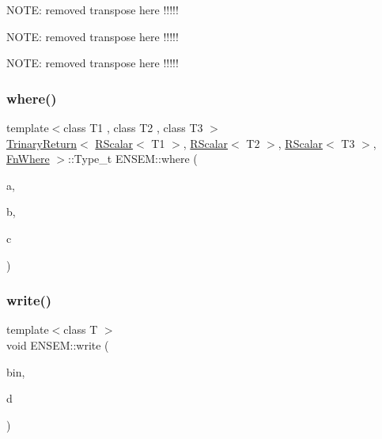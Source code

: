 N\+O\+TE\+: removed transpose here !!!!!

N\+O\+TE\+: removed transpose here !!!!!

N\+O\+TE\+: removed transpose here !!!!! \mbox{\label{group__rscalar_gab32228a08de8d1e17ba1f7829c1aff56}} 
\subsubsection{\texorpdfstring{where()}{where()}}
{\footnotesize\ttfamily template$<$class T1 , class T2 , class T3 $>$ \\
\mbox{\hyperlink{structENSEM_1_1TrinaryReturn}{Trinary\+Return}}$<$ \mbox{\hyperlink{classENSEM_1_1RScalar}{R\+Scalar}}$<$ T1 $>$, \mbox{\hyperlink{classENSEM_1_1RScalar}{R\+Scalar}}$<$ T2 $>$, \mbox{\hyperlink{classENSEM_1_1RScalar}{R\+Scalar}}$<$ T3 $>$, \mbox{\hyperlink{structENSEM_1_1FnWhere}{Fn\+Where}} $>$\+::Type\+\_\+t E\+N\+S\+E\+M\+::where (\begin{DoxyParamCaption}\item[{const \mbox{\hyperlink{classENSEM_1_1RScalar}{R\+Scalar}}$<$ T1 $>$ \&}]{a,  }\item[{const \mbox{\hyperlink{classENSEM_1_1RScalar}{R\+Scalar}}$<$ T2 $>$ \&}]{b,  }\item[{const \mbox{\hyperlink{classENSEM_1_1RScalar}{R\+Scalar}}$<$ T3 $>$ \&}]{c }\end{DoxyParamCaption})\hspace{0.3cm}{\ttfamily [inline]}}

\mbox{\label{group__rscalar_ga22fa002fd1c18dfe5d521aef45102477}} 
\subsubsection{\texorpdfstring{write()}{write()}}
{\footnotesize\ttfamily template$<$class T $>$ \\
void E\+N\+S\+E\+M\+::write (\begin{DoxyParamCaption}\item[{\mbox{\hyperlink{classADATIO_1_1BinaryWriter}{A\+D\+A\+T\+I\+O\+::\+Binary\+Writer}} \&}]{bin,  }\item[{const \mbox{\hyperlink{classENSEM_1_1RScalar}{R\+Scalar}}$<$ T $>$ \&}]{d }\end{DoxyParamCaption})\hspace{0.3cm}{\ttfamily [inline]}}



